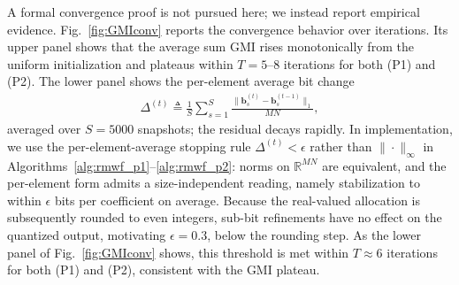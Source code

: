 \documentclass[10pt, twocolumn, comsoc]{IEEEtran}
\begin{document}
A formal convergence proof is not pursued here; we instead report empirical evidence.
Fig.~\ref{fig:GMIconv} reports the convergence behavior over iterations. Its upper panel shows that the average sum GMI rises monotonically from the uniform initialization and plateaus within $T=5$--$8$ iterations for both (P1) and (P2).
The lower panel shows the per-element average bit change
\begin{align}
\Delta^{(t)} \triangleq \frac{1}{S}\sum_{s=1}^{S}
\frac{\|\mathbf{b}_s^{(t)} - \mathbf{b}_s^{(t-1)}\|_1}{MN},
\label{eq:bit_change}
\end{align}
averaged over $S=5000$ snapshots; 
the residual decays rapidly.
In implementation, we use the per-element-average stopping rule
$\Delta^{(t)}<\epsilon$ rather than $\|\cdot\|_\infty$ in Algorithms~\ref{alg:rmwf_p1}--\ref{alg:rmwf_p2}: norms on $\mathbb{R}^{MN}$ are equivalent, and the per-element form admits a size-independent reading, namely stabilization to within $\epsilon$ bits per coefficient on average. 
Because the real-valued allocation is subsequently rounded to even integers, sub-bit refinements have no effect on the quantized output, motivating $\epsilon=0.3$, below the rounding step. As the lower panel of Fig.~\ref{fig:GMIconv} shows, this threshold is met within $T\approx 6$ iterations for both (P1) and (P2), consistent with the GMI plateau.


\end{document}
